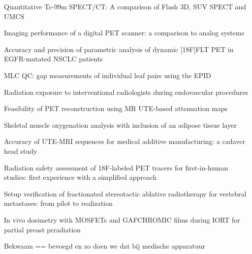 \documentclass[a4paper,10pt]{report}
\begin{document}
\begin{multicols*}{3}
\begin{packed_enum}
\item[\#1] Quantitative Tc-99m SPECT/CT: A com\-par\-i\-son of Flash 3D, SUV SPECT and UMCS
\item[\#2] Imaging performance of a digital PET scanner: a com\-par\-i\-son to analog systems
\item[\#3] Accuracy and precision of parametric analysis of dynamic [18F]FLT PET in EGFR-mutated NSCLC patients
\item[\#4] MLC QC: gap measurements of individual leaf pairs using the EPID
\item[\#5] Radiation exposure to interventional radiologists during endovascular procedures
\item[\#6] Feasibility of PET reconstruction using MR UTE-based attenuation maps
\item[\#7] Skeletal muscle oxygenation analysis with inclusion of an adipose tissue layer
\item[\#8] Accuracy of UTE-MRI sequences for medical additive manufacturing: a cadaver head study
\item[\#9] Radiation safety assessment of 18F-labeled PET tracers for first-in-human studies: first experience with a simplified approach
\item[\#10] Setup verification of fractionated stereotactic ablative radiotherapy for vertebral metastases: from pilot to realization
\item[\#11] In vivo dosimetry with MOSFETs and GAFCHROMIC films during IORT for partial preast prradiation
\item[\#12] Bekwaam == bevoegd en zo doen we dat bij medische apparatuur %
\end{packed_enum}



\end{multicols*}
\end{document}
